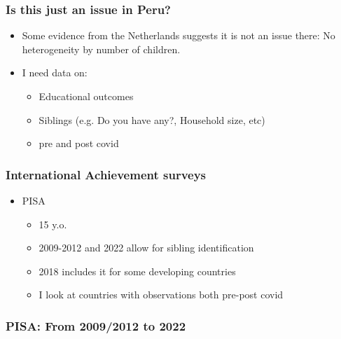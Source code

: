 \documentclass{beamer}
\begin{document}
\begin{frame}
    \label{update_scott}
    \frametitle{Is this just an issue in Peru?}
    \begin{itemize}
        \item Some evidence from the Netherlands suggests it is not an issue there: No heterogeneity by number of children.
        \item I need data on:
            \begin{itemize}
                \item Educational outcomes
                \item Siblings (e.g. Do you have any?, Household size, etc)
                \item pre and post covid
            \end{itemize}
    \end{itemize}
\end{frame}



\begin{frame}
    \label{update_scott}
    \frametitle{International Achievement surveys}
    \begin{itemize}
        \item PISA
            \begin{itemize}
                \item 15 y.o.
                \item 2009-2012 and 2022 allow for sibling identification
                \item 2018 includes it for some developing countries
                \item I look at countries with observations both pre-post covid
            \end{itemize}            
    \end{itemize}
\end{frame}


\begin{frame}
    \label{update_scott}
    \frametitle{PISA: From 2009/2012 to 2022}
        {
    }
\end{frame}
\end{document}

